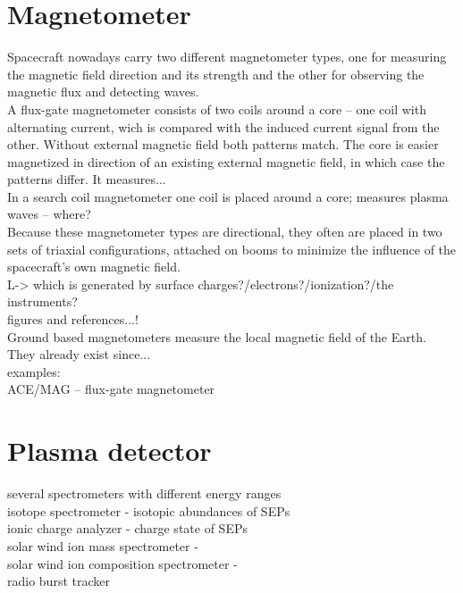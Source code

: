 \section{Magnetometer}

Spacecraft nowadays carry two different magnetometer types, one for measuring the magnetic field direction and its strength and the other for observing the magnetic flux and detecting waves.\\

A flux-gate magnetometer consists of two coils around a core -- one coil with alternating current, wich is compared with the induced current signal from the other. Without external magnetic field both patterns match. The core is easier magnetized in direction of an existing external magnetic field, in which case the patterns differ. It measures...\\
In a search coil magnetometer one coil is placed around a core; measures plasma waves -- where?\\

Because these magnetometer types are directional, they often are placed in two sets of triaxial configurations, attached on booms to minimize the influence of the spacecraft's own magnetic field.\\
L-> which is generated by surface charges?/electrons?/ionization?/the instruments?\\

figures and references...!\\

Ground based magnetometers measure the local magnetic field of the Earth. They already exist since...\\

examples:\\
ACE/MAG -- flux-gate magnetometer\\



\section{Plasma detector}

several spectrometers with different energy ranges\\

isotope spectrometer - isotopic abundances of SEPs\\
ionic charge analyzer - charge state of SEPs\\
solar wind ion mass spectrometer - \\
solar wind ion composition spectrometer - \\
radio burst tracker\\


